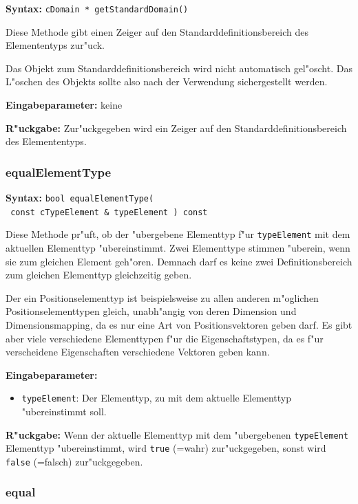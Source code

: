 \textbf{Syntax:} \verb|cDomain * getStandardDomain()|

\bigskip\noindent
Diese Methode gibt einen Zeiger auf den Standarddefinitionsbereich des Elemententyps zur"uck.

Das Objekt zum Standarddefinitionsbereich wird nicht automatisch gel"oscht. Das L"oschen des Objekts sollte also nach der Verwendung sichergestellt werden.

\bigskip\noindent
\textbf{Eingabeparameter:} keine

\bigskip\noindent
\textbf{R"uckgabe:} Zur"uckgegeben wird ein Zeiger auf den Standarddefinitionsbereich des Elemententyps.


\subsubsection{equalElementType}

\textbf{Syntax:} \verb|bool equalElementType(| \\\verb| const cTypeElement & typeElement ) const|

\bigskip\noindent
Diese Methode pr"uft, ob der "ubergebene Elementtyp f"ur \verb|typeElement| mit dem aktuellen Elementtyp "ubereinstimmt. Zwei Elementtype stimmen "uberein, wenn sie zum gleichen Element geh"oren. Demnach darf es keine zwei Definitionsbereich zum gleichen Elementtyp gleichzeitig geben.

Der ein Positionselementtyp ist beispielsweise zu allen anderen m"oglichen Positionselementtypen gleich, unabh"angig von deren Dimension und Dimensionsmapping, da es nur eine Art von Positionsvektoren geben darf. Es gibt aber viele verschiedene Elementtypen f"ur die Eigenschaftstypen, da es f"ur verscheidene Eigenschaften verschiedene Vektoren geben kann.

\bigskip\noindent
\textbf{Eingabeparameter:}
\begin{itemize}
 \item \verb|typeElement|: Der Elementtyp, zu mit dem aktuelle Elementtyp "ubereinstimmt soll.
\end{itemize}

\bigskip\noindent
\textbf{R"uckgabe:} Wenn der aktuelle Elementtyp mit dem "ubergebenen \verb|typeElement| Elementtyp "ubereinstimmt, wird \verb|true| (=wahr) zur"uckgegeben, sonst wird \verb|false| (=falsch) zur"uckgegeben.


\subsubsection{equal}


